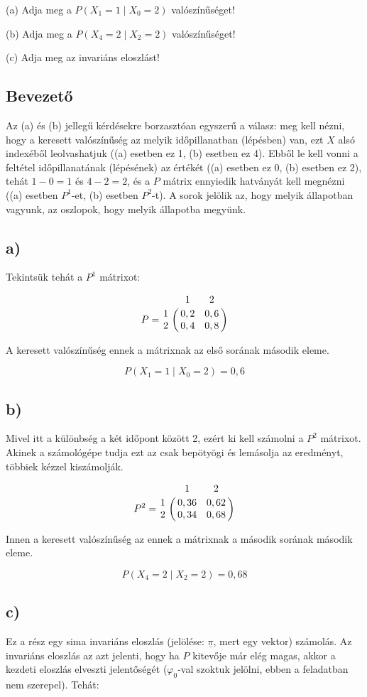 \documentclass[a4paper,12pt]{article}
\begin{document}
(a) Adja meg a $P(X_1 = 1 \mid X_0 = 2)$ valószínűséget!

(b) Adja meg a $P(X_4 = 2 \mid X_2 = 2)$ valószínűséget!

(c) Adja meg az invariáns eloszlást!

\subsection*{Bevezető}
Az (a) és (b) jellegű kérdésekre borzasztóan egyszerű a válasz:
meg kell nézni, hogy a keresett valószínűség az  melyik időpillanatban 
(lépésben) van, ezt $X$ alsó indexéből leolvashatjuk ((a) esetben ez 1,
(b) esetben ez 4). 
Ebből le kell vonni a feltétel időpillanatának (lépésének) az értékét 
((a) esetben ez 0, (b) esetben ez 2), tehát $1-0=1$ és $4-2=2$, és a 
$P$ mátrix ennyiedik hatványát kell megnézni
((a) esetben $P^1$-et, (b) esetben $P^2$-t). A sorok jelölik az, hogy 
melyik állapotban vagyunk, az oszlopok, hogy melyik állapotba megyünk.

\subsection*{a)}
Tekintsük tehát a $P^1$ mátrixot:

\[
P = 
\bordermatrix{
~	&	1	&	2	\cr
1	&	0,2	&	0,6	\cr
2	&	0,4	&	0,8}
\]

A keresett valószínűség ennek a mátrixnak az első sorának második eleme.

\[
P(X_1 = 1 \mid X_0 = 2) = 0,6
\]

\subsection*{b)}
Mivel itt a különbség a két időpont között 2, ezért ki kell számolni a 
$P^2$ mátrixot. Akinek a számológépe tudja ezt az csak bepötyögi és 
lemásolja az eredményt,  többiek kézzel kiszámolják.

\[
P^2 = 
\bordermatrix{
~	&	1	    &	2    	\cr
1	&	0,36	&	0,62	\cr
2	&	0,34	&	0,68}
\]

Innen a keresett valószínűség az ennek a mátrixnak a második sorának
második eleme.

\[
P(X_4 = 2 \mid X_2 = 2) = 0,68
\]

\subsection*{c)}
Ez a rész egy sima invariáns eloszlás (jelölése: $\underline{\pi}$, 
mert egy vektor) számolás. Az invariáns eloszlás 
az azt jelenti, hogy ha $P$ kitevője már elég magas, akkor a kezdeti
eloszlás elveszti jelentőségét ($\varphi_0$-val szoktuk jelölni, ebben a
feladatban nem szerepel). Tehát:
\end{document}
